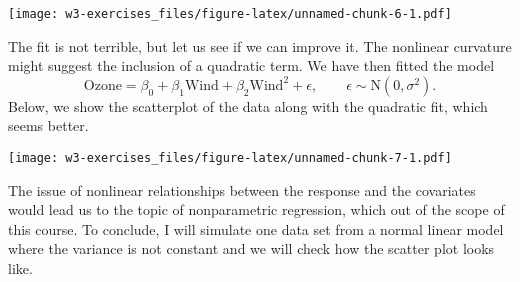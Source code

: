 \documentclass[
]{article}
\newenvironment{Shaded}{\begin{snugshade}}{\end{snugshade}}
\newcommand{\DataTypeTok}[1]{\textcolor[rgb]{0.13,0.29,0.53}{#1}}
\newcommand{\DecValTok}[1]{\textcolor[rgb]{0.00,0.00,0.81}{#1}}
\newcommand{\KeywordTok}[1]{\textcolor[rgb]{0.13,0.29,0.53}{\textbf{#1}}}
\newcommand{\NormalTok}[1]{#1}
\newcommand{\OperatorTok}[1]{\textcolor[rgb]{0.81,0.36,0.00}{\textbf{#1}}}
\newcommand{\StringTok}[1]{\textcolor[rgb]{0.31,0.60,0.02}{#1}}
\begin{document}
\texttt{[image: w3-exercises\_files/figure-latex/unnamed-chunk-6-1.pdf]}

The fit is not terrible, but let us see if we can improve it. The
nonlinear curvature might suggest the inclusion of a quadratic term. We
have then fitted the model \begin{equation*}
\text{Ozone}=\beta_0+\beta_1\text{Wind}+\beta_2\text{Wind}^2+\epsilon,\qquad \epsilon\sim\text{N}(0,\sigma^2).
\end{equation*} Below, we show the scatterplot of the data along with
the quadratic fit, which seems better.

\begin{Shaded}
\end{Shaded}

\texttt{[image: w3-exercises\_files/figure-latex/unnamed-chunk-7-1.pdf]}

The issue of nonlinear relationships between the response and the
covariates would lead us to the topic of nonparametric regression, which
out of the scope of this course. To conclude, I will simulate one data
set from a normal linear model where the variance is not constant and we
will check how the scatter plot looks like.
\end{document}
